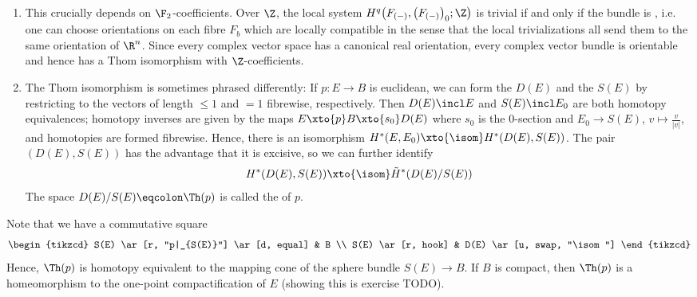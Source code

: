 \begin{remark}
	\leavevmode
	\begin{enumerate}
		\item This crucially depends on $\F_2$-coefficients.
			Over $\Z$, the local system $H^q\big(F_{({{-}})}, \big(F_{({{-}})}\big)_0; \Z\big)$ is trivial if and only if the bundle is , i.e. one can choose orientations on each fibre $F_b$ which are locally compatible in the sense that the local trivializations all send them to the same orientation of $\R^n$.
			Since every complex vector space has a canonical real orientation, every complex vector bundle is orientable and hence has a Thom isomorphism with $\Z$-coefficients.
		\item The Thom isomorphism is sometimes phrased differently:
			If $p\colon E \to B$ is euclidean, we can form the  $D(E)$ and the  $S(E)$ by restricting to the vectors of length $\leq 1$ and $= 1$ fibrewise, respectively.
			Then $D(E) \incl E$ and $S(E) \incl E_0$ are both homotopy equivalences; homotopy inverses are given by the maps $E \xto{p} B \xto{s_0} D(E)$ where $s_0$ is the 0-section and $E_0 \to S(E)$, $v \mapsto \frac{v}{|v|}$, and homotopies are formed fibrewise.
			Hence, there is an isomorphism $H^*(E, E_0) \xto{\isom} H^*(D(E), S(E))$.
			The pair $(D(E), S(E))$ has the advantage that it is excisive, so we can further identify
			\begin{equation*}
				H^*(D(E), S(E)) \xto{\isom} \tilde{H}^*(D(E) / S(E))
			\end{equation*}
			The space $D(E) / S(E) \eqcolon \Th(p)$ is called the  of $p$.
	\end{enumerate}
\end{remark}
Note that we have a commutative square
\begin{equation*}
	\begin{tikzcd}
		S(E)
				\ar[r, "p|_{S(E)}"]
				\ar[d, equal]
			& B
		\\
		S(E)
				\ar[r, hook]
			& D(E)
				\ar[u, swap, "\isom"]
	\end{tikzcd}
\end{equation*}
Hence, $\Th(p)$ is homotopy equivalent to the mapping cone of the sphere bundle $S(E) \to B$.
If $B$ is compact, then $\Th(p)$ is a homeomorphism to the one-point compactification of $E$ (showing this is exercise TODO).
